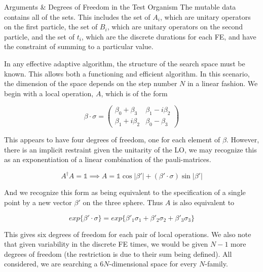 \documentclass[14pt]{beamer}
\begin{document}
\begin{frame}
\begin{columns}
\begin{column}{.45\textwidth}
\begin{block}{Arguments \& Degrees of Freedom in the Test Organism}
	The mutable data contains all of the sets. This includes the set of $A_i$, which are unitary operators on the first particle, the set of $B_i$, which are unitary operators on the second particle, and the set of $t_i$, which are the discrete durations for each FE, and have the constraint of summing to a particular value.
	
	In any effective adaptive algorithm, the structure of the search space must be known. This allows both a functioning and efficient algorithm. In this scenario, the dimension of the space depends on the step number $N$ in a linear fashion. We begin with a local operation, $A$, which is of the form

	\begin{equation}
		\beta \cdot \sigma 
		= 
		\begin{pmatrix}
			\beta_0 + \beta_3    &    \beta_1 - i \beta_2\\[3mm]
			\beta_1 + i \beta_2  &    \beta_0 - \beta_3
		\end{pmatrix}
	\end{equation}

	This appears to have four degrees of freedom, one for each element of $\beta$. However, there is an implicit restraint given the unitarity of the LO, we may recognize this as an exponentiation of a linear combination of the pauli-matrices. 

	\begin{equation}
		A^{\dagger}A = \mathds{1} \implies A = \mathds{1}\cos{|\beta'|} + (\beta' \cdot \sigma) \sin{|\beta'|}
	\end{equation}

	And we recognize this form as being equivalent to the specification of a single point by a new vector $\beta'$ on the three sphere. Thus $A$ is also equivalent to 

	\begin{equation}
		exp\{\beta' \cdot \sigma\} = exp\{\beta'_1 \sigma_1 + \beta'_2 \sigma_2 + \beta'_3 \sigma_3 \}
	\end{equation}

	This gives six degrees of freedom for each pair of local operations. We also note that given variability in the discrete FE times, we would be given $N-1$ more degrees of freedom (the restriction is due to their sum being defined). All considered,  we are searching a $6N$-dimensional space for every $N$-family.



				\end{block}


\end{column}
\end{columns}
\end{frame}
\end{document}
